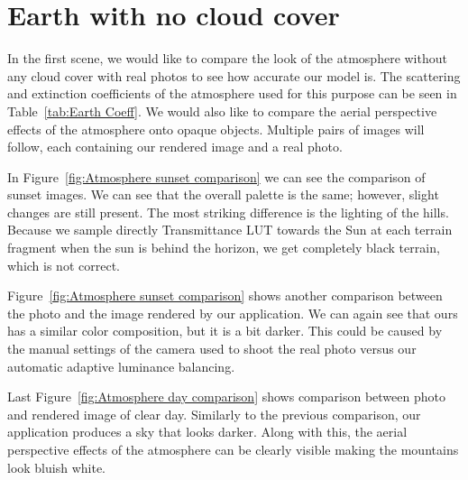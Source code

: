 \documentclass{ctuthesis}
\begin{document}
\section{Earth with no cloud cover}
In the first scene, we would like to compare the look of the atmosphere without any cloud cover with real photos to 
see how accurate our model is. The scattering and extinction coefficients of the atmosphere used for this purpose can be seen 
in Table~\ref{tab:Earth Coeff}. We would also like to compare the aerial perspective effects of the atmosphere onto 
opaque objects. Multiple pairs of images will follow, each containing our rendered image and a real photo. 

In Figure~\ref{fig:Atmosphere sunset comparison} we can see the comparison of sunset images. We can see that the 
overall palette is the same; however, slight changes are still present. The most striking difference is the 
lighting of the hills. Because we sample directly Transmittance LUT towards the Sun at each terrain fragment when 
the sun is behind the horizon, we get completely black terrain, which is not correct.

Figure~\ref{fig:Atmosphere sunset comparison} shows another comparison between the photo and the image rendered by our application.
We can again see that ours has a similar color composition, but it is a bit darker. This could be caused by the manual settings
of the camera used to shoot the real photo versus our automatic adaptive luminance balancing.


Last Figure~\ref{fig:Atmosphere day comparison} shows comparison between photo and rendered image of clear day.
Similarly to the previous comparison, our application produces a sky that looks darker. Along with this, the aerial perspective
effects of the atmosphere can be clearly visible making the mountains look bluish white.
\end{document}

